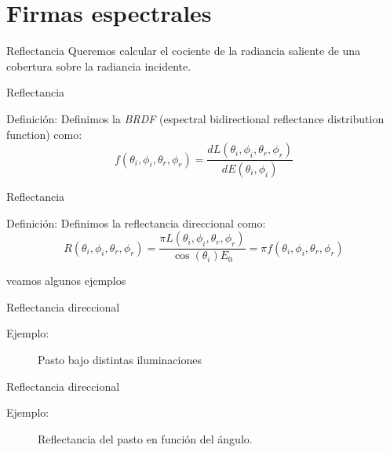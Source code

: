 \documentclass[handout,draft]{beamer}
\begin{document}
\section{Firmas espectrales}
\begin{frame}{Reflectancia}
  Queremos calcular el cociente de la radiancia saliente de una cobertura sobre la radiancia incidente.
\end{frame}

\begin{frame}{Reflectancia}
  \begin{block}{Definición:}
    Definimos la \emph{BRDF} (espectral bidirectional reflectance distribution function) como:
    $$ f(\theta_i, \phi_i, \theta_r, \phi_r) = \frac{dL(\theta_i, \phi_i, \theta_r, \phi_r)}{dE(\theta_i, \phi_i)}$$
  \end{block}
\end{frame}

\begin{frame}{Reflectancia}
  \begin{block}{Definición:}
    Definimos la reflectancia direccional como:
    $$ R(\theta_i, \phi_i, \theta_r, \phi_r) = \frac{\pi L(\theta_i, \phi_i, \theta_r, \phi_r)}{\cos(\theta_i) E_0} = \pi f(\theta_i, \phi_i, \theta_r, \phi_r)$$
  \end{block}
  veamos algunos ejemplos
\end{frame}

\begin{frame}{Reflectancia direccional}
  \begin{exampleblock}{Ejemplo:}
    \begin{figure}
      \caption{Pasto bajo distintas iluminaciones}
    \end{figure}
  \end{exampleblock}
\end{frame}

\begin{frame}{Reflectancia direccional}
  \begin{exampleblock}{Ejemplo:}
    \begin{figure}
      \caption{Reflectancia del pasto en función del ángulo.}
    \end{figure}
  \end{exampleblock}
\end{frame}
\end{document}
